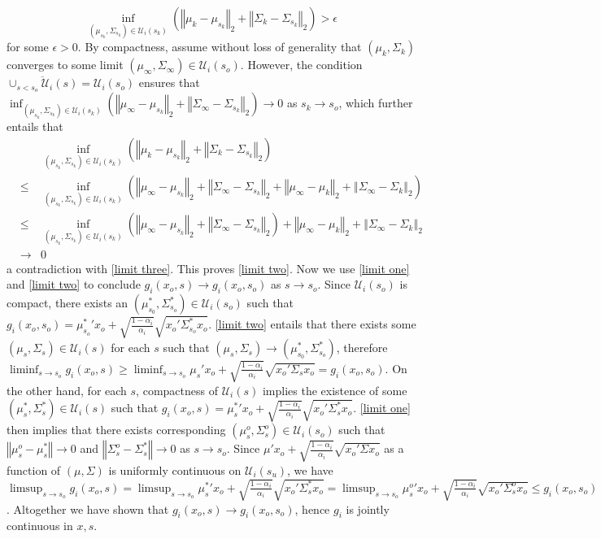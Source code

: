 \documentclass[mnsc,blindrev]{informs4} %
\newcommand{\norm}[1]{\left \Vert #1 \right\Vert}
\begin{document}
\begin{equation}\label{limit three}
\inf_{(\mu_{s_k},\Sigma_{s_k})\in\mathcal U_i(s_k)}(\norm{\mu_k-\mu_{s_k}}_2+\norm{\Sigma_k-\Sigma_{s_k}}_2)>\epsilon
\end{equation}
for some $\epsilon>0$. By compactness, assume without loss of generality that $(\mu_k,\Sigma_k)$ converges to some limit $(\mu_{\infty},\Sigma_{\infty})\in \mathcal U_i(s_o)$. However, the condition $\overline{\cup_{s<s_o}\mathcal U_i(s)}=\mathcal U_i(s_o)$ ensures that $\inf_{(\mu_{s_k},\Sigma_{s_k})\in\mathcal U_i(s_k)}(\norm{\mu_{\infty}-\mu_{s_k}}_2+\norm{\Sigma_{\infty}-\Sigma_{s_k}}_2)\to 0$ as $s_k\to s_o$, which further entails that
\begin{eqnarray*}
&&\inf_{(\mu_{s_k},\Sigma_{s_k})\in\mathcal U_i(s_k)}(\norm{\mu_k-\mu_{s_k}}_2+\norm{\Sigma_k-\Sigma_{s_k}}_2)\\
&\leq &\inf_{(\mu_{s_k},\Sigma_{s_k})\in\mathcal U_i(s_k)}(\norm{\mu_{\infty}-\mu_{s_k}}_2+\norm{\Sigma_{\infty}-\Sigma_{s_k}}_2+\norm{\mu_{\infty}-\mu_k}_2+\norm{\Sigma_{\infty}-\Sigma_k}_2)\\
&\leq &\inf_{(\mu_{s_k},\Sigma_{s_k})\in\mathcal U_i(s_k)}(\norm{\mu_{\infty}-\mu_{s_k}}_2+\norm{\Sigma_{\infty}-\Sigma_{s_k}}_2)+\norm{\mu_{\infty}-\mu_k}_2+\norm{\Sigma_{\infty}-\Sigma_k}_2\\
&\to& 0
\end{eqnarray*}
a contradiction with \eqref{limit three}. This proves \eqref{limit two}. Now we use \eqref{limit one} and \eqref{limit two} to conclude $g_i(x_o,s) \to g_i(x_o,s_o)$ as $s\to s_o$. Since $\mathcal U_i(s_o)$ is compact, there exists an $(\mu^*_{s_0},\Sigma^*_{s_o})\in\mathcal U_i(s_o)$ such that $g_i(x_o,s_o)={\mu_{s_o}^*}'x_o+\sqrt{\frac{1-\alpha_i}{\alpha_i}}\sqrt{x_o'\Sigma^*_{s_o} x_o}$. \eqref{limit two} entails that there exists some $(\mu_s,\Sigma_s)\in \mathcal U_i(s)$ for each $s$ such that $(\mu_s,\Sigma_s)\to (\mu^*_{s_0},\Sigma^*_{s_o})$, therefore $\liminf_{s\to s_o}g_i(x_o,s)\geq \liminf_{s\to s_o}\mu_s'x_o+\sqrt{\frac{1-\alpha_i}{\alpha_i}}\sqrt{x_o'\Sigma_s x_o}=g_i(x_o,s_o)$. On the other hand, for each $s$, compactness of $\mathcal U_i(s)$ implies the existence of some $(\mu^*_s,\Sigma^*_s)\in \mathcal U_i(s)$ such that $g_i(x_o,s)={\mu_s^*}'x_o+\sqrt{\frac{1-\alpha_i}{\alpha_i}}\sqrt{x_o'\Sigma^*_s x_o}$. \eqref{limit one} then implies that there exists corresponding $(\mu^o_s,\Sigma^o_s)\in \mathcal U_i(s_o)$ such that $\norm{\mu^o_s-\mu^*_s}\to 0$ and $\norm{\Sigma^o_s-\Sigma^*_s}\to 0$ as $s\to s_o$. Since $\mu'x_o+\sqrt{\frac{1-\alpha_i}{\alpha_i}}\sqrt{x_o'\Sigma x_o}$ as a function of $(\mu,\Sigma)$ is uniformly continuous on $\mathcal U_i(s_u)$, we have $\limsup_{s\to s_o}g_i(x_o,s)=\limsup_{s\to s_o}{\mu_s^*}'x_o+\sqrt{\frac{1-\alpha_i}{\alpha_i}}\sqrt{x_o'\Sigma^*_s x_o}=\limsup_{s\to s_o}{\mu_s^o}'x_o+\sqrt{\frac{1-\alpha_i}{\alpha_i}}\sqrt{x_o'\Sigma^o_s x_o}\leq g_i(x_o,s_o)$. Altogether we have shown that $g_i(x_o,s) \to g_i(x_o,s_o)$, hence $g_i$ is jointly continuous in $x,s$.
\end{document}
